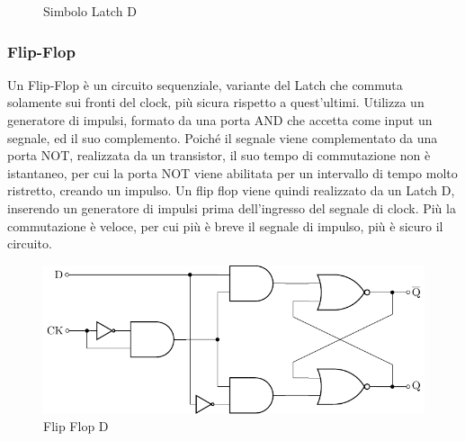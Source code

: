 \documentclass{article}
\numberwithin{equation}{subsection}
\begin{document}
\begin{figure}[H]%
    \centering%
    \qquad%
    \caption{Simbolo Latch D}%
\end{figure}

\subsubsection{Flip-Flop}

Un Flip-Flop è un circuito sequenziale, variante del Latch che commuta solamente sui fronti del clock, più sicura rispetto a quest'ultimi. Utilizza un generatore di impulsi, formato da una porta AND che accetta come 
input un segnale, ed il suo complemento. Poiché il segnale viene complementato da una porta NOT, realizzata da un transistor, il suo tempo di commutazione non è istantaneo, per cui la porta NOT viene abilitata per 
un intervallo di tempo molto ristretto, creando un impulso. 
Un flip flop viene quindi realizzato da un Latch D, inserendo un generatore di impulsi prima dell'ingresso del segnale di clock. Più la commutazione è veloce, per cui più è breve il segnale di impulso, più è sicuro 
il circuito. 

\begin{figure}[H]%
    \centering%
    \includegraphics{flip-flop-d.pdf}%
    \caption{Flip Flop D}%
\end{figure}
\end{document}
